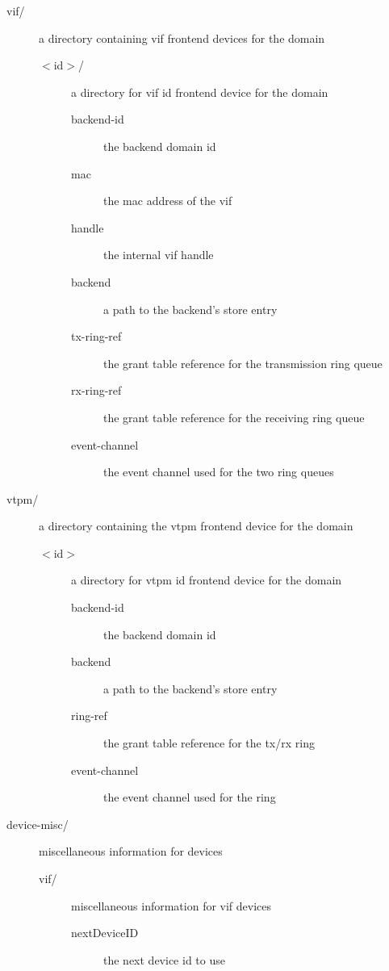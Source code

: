 \documentclass[11pt,twoside,final,openright,a4paper]{report}
\begin{document}
\begin{description}
\begin{description}
\begin{description}
      \item[vif/] a directory containing vif frontend devices for the
	domain
	\begin{description}
	\item[$<$id$>$/] a directory for vif id frontend device for the domain
	  \begin{description}
	  \item[backend-id] the backend domain id
	  \item[mac] the mac address of the vif
	  \item[handle] the internal vif handle
	  \item[backend] a path to the backend's store entry
	  \item[tx-ring-ref] the grant table reference for the transmission ring queue 
	  \item[rx-ring-ref] the grant table reference for the receiving ring queue 
	  \item[event-channel] the event channel used for the two ring queues 
	  \end{description}
	\end{description}

      \item[vtpm/] a directory containing the vtpm frontend device for the
        domain
        \begin{description}
        \item[$<$id$>$] a directory for vtpm id frontend device for the domain
          \begin{description}
	  \item[backend-id] the backend domain id
          \item[backend] a path to the backend's store entry
          \item[ring-ref] the grant table reference for the tx/rx ring
          \item[event-channel] the event channel used for the ring
          \end{description}
        \end{description}
	
      \item[device-misc/] miscellaneous information for devices 
	\begin{description}
	\item[vif/] miscellaneous information for vif devices
	  \begin{description}
	  \item[nextDeviceID] the next device id to use 
	  \end{description}
	\end{description}
      \end{description}
    \end{description}


\end{description}
\end{document}
